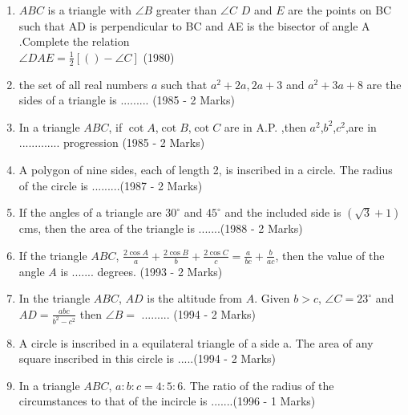 \documentclass[journal,12pt,twocolumn]{IEEEtran}
\theoremstyle{remark}
\begin{document}
\begin{enumerate}
    \item $ABC$ is a triangle with $\angle B $ greater than $\angle C$ 
    $D$ and $E$ are the points on BC such that AD is perpendicular to BC and AE is the bisector of angle A .Complete the relation\\
    $\angle DAE = \displaystyle\frac{1}{2} [( ) - \angle C]$
    \hfill (1980)
    \\
    \item the set of all real numbers $a$ such that $a^2 + 2a, 2a + 3$ and $a^2 + 3a + 8$ are the sides of a triangle is .........
    \hfill (1985 - 2 Marks)
    \\
    \item In a triangle $ABC$, if $\cot A$,$\cot B$,$\cot C$ are in A.P. ,then $a^2$,$b^2$,$c^2$,are in ............. progression \hfill (1985 - 2 Marks)
    \\
    \item A polygon of nine sides, each of length 2, is inscribed in a circle. The radius of the circle is .........\hfill (1987 - 2 Marks) 
    \\
    \item If the angles of a triangle are $30^\circ$ and $45^\circ$ and the included side is $(\sqrt{3} + 1)$ cms, then the area of the triangle is .......\hfill (1988 - 2 Marks)
    \\
    \item If the triangle $ABC$, $\displaystyle\frac{2\cos A}{a} + \displaystyle\frac{2\cos B}{b} + \displaystyle\frac{2\cos C}{c} = \displaystyle\frac{a}{bc} + \displaystyle\frac{b}{ac}$, then the value of the angle $A$ is ....... degrees. \hfil (1993 - 2 Marks)
    \\
    \item In the triangle $ABC$, $AD$ is the altitude from $A$. Given $b>c$, $\angle C=23^\circ$ and $AD = \displaystyle\frac{abc}{b^2 - c^2}$ then $\angle B = $ ......... \hfill (1994 - 2 Marks)
    \\
    \item A circle is inscribed in a equilateral triangle of a side a. The area of any square inscribed in this circle is .....\hfill (1994 - 2 Marks)  
    \\
    \item In a triangle $ABC$, $a:b:c = 4:5:6$. The ratio of the radius of the circumstances to that of the incircle is .......\hfill (1996 - 1 Marks) 
\end{enumerate}
\end{document}
